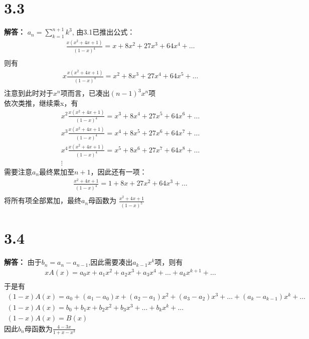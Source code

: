 \documentclass{article}
\begin{document}
\section*{3.3}
\textbf{解答：}
$a_n = \sum_{k=1}^{n + 1} k^3$,
由3.1已推出公式：
\begin{gather*}
    \frac{x(x^2 + 4x + 1)}{(1 - x)^4} = x + 8x^2 + 27x^3 + 64x^4 + \dots \\
\end{gather*} 
则有
\begin{gather*}
    x\frac{x(x^2 + 4x + 1)}{(1 - x)^4} = x^2 + 8x^3 + 27x^4 + 64x^5 + \dots \\
\end{gather*} 
注意到此时对于$x^n$项而言，已凑出$(n-1)^3x^n$项\\
依次类推，继续乘x，有
\begin{gather*}
    x^2\frac{x(x^2 + 4x + 1)}{(1 - x)^4} = x^3 + 8x^4 + 27x^5 + 64x^6 + \dots \\
    x^3\frac{x(x^2 + 4x + 1)}{(1 - x)^4} = x^4 + 8x^5 + 27x^6 + 64x^7 + \dots \\
    x^4\frac{x(x^2 + 4x + 1)}{(1 - x)^4} = x^5 + 8x^6 + 27x^7 + 64x^8 + \dots \\
    \vdots  
\end{gather*} 
需要注意$a_n$最终累加至$n+1$，因此还有一项：
\begin{gather*}
    \frac{x^2 + 4x + 1}{(1 - x)^4} = 1 + 8x + 27x^2 + 64x^3 + \dots \\
\end{gather*} 
将所有项全部累加，最终$a_n$母函数为
$\frac{x^2 + 4x + 1}{(1 - x)^5}$

\section*{3.4}
\textbf{解答：}
由于$b_n = a_n - a_{n - 1}$,因此需要凑出$a_{k - 1}x^k$项，则有
\begin{gather*}
    xA(x) = a_0x + a_1x^2 + a_2x^3 + a_3x^4 + \dots + a_kx^{k + 1} + \dots\\
\end{gather*} 
于是有
\begin{gather*}
    (1 - x)A(x) = a_0 + (a_1 - a_0)x + (a_2 - a_1)x^2 + (a_3 - a_2)x^3 + \dots + (a_k - a_{k - 1})x^k + \dots\\
    (1 - x)A(x) = b_0 + b_1x + b_2x^2 + b_3x^3 + \dots + b_kx^k + \dots \\
    (1 - x)A(x) = B(x)
\end{gather*} 
因此$b_n$母函数为$\frac{4 - 3x}{1 + x - x^3}$
\end{document}
